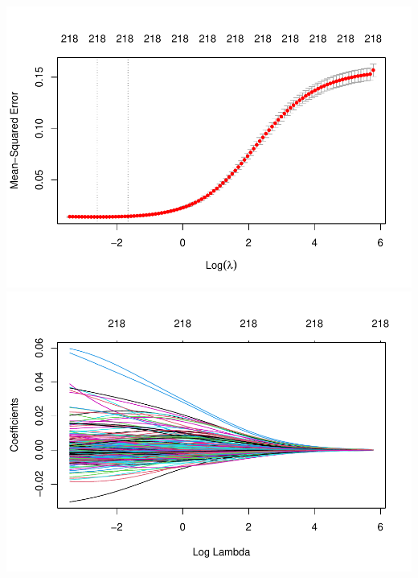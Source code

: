 \documentclass[
]{article}
\begin{document}
\includegraphics{Eric_Hirsch_621_Final_HomePrices_files/figure-latex/unnamed-chunk-16-1.pdf}
\includegraphics{Eric_Hirsch_621_Final_HomePrices_files/figure-latex/unnamed-chunk-16-2.pdf}
\end{document}
